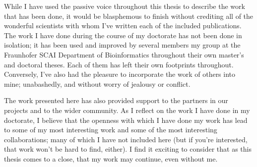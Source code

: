 While I have used the passive voice throughout this thesis to describe the work that has been done, it would be blasphemous to finish without crediting all of the wonderful scientists with whom I've written each of the included publications.
The work I have done during the course of my doctorate has not been done in isolation; it has been used and improved by several members my group at the Fraunhofer SCAI Department of Bioinformatics throughout their own master's and doctoral theses.
Each of them has left their own footprints throughout.
Conversely, I've also had the pleasure to incorporate the work of others into mine; unabashedly, and without worry of jealousy or conflict.

The work presented here has also provided support to the partners in our projects and to the wider community.
As I reflect on the work I have done in my doctorate, I believe that the openness with which I have done my work has lead to some of my most interesting work and some of the most interesting collaborations; many of which I have not included here (but if you're interested, that work won't be hard to find, either).
I find it exciting to consider that as this thesis comes to a close, that my work may continue, even without me.
